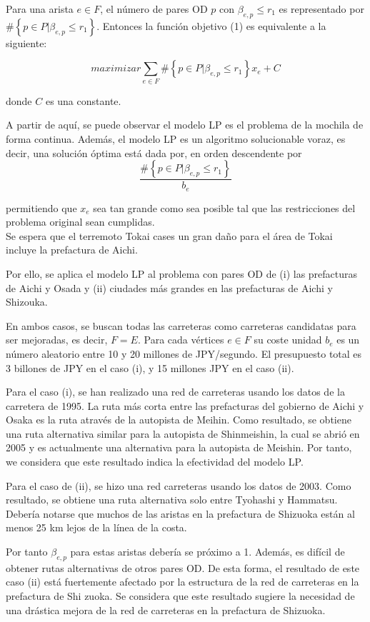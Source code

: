 \documentclass[10pt]{report}
\begin{document}
Para una arista $e \in F$, el número de pares OD $p$ con $\beta_{e,p} \leq r_{1}$ es representado por $\#\left\{ p \in P | \beta_{e,p} \leq r_{1} \right \}$. 
Entonces la función objetivo  (1) es equivalente a la siguiente:

$$
maximizar \sum_{e \in F} \#\left\{ p \in P | \beta_{e,p} \leq r_{1} \right\} x_{e} + C
$$

donde $C$ es una constante.

A partir de aquí, se puede observar el modelo LP es el problema de la mochila de forma continua. Además, el modelo LP es un algoritmo solucionable voraz, es decir, una solución óptima está dada por, en orden descendente  por
$$
\frac{\#\left\{ p \in P | \beta_{e,p} \leq r_{1} \right\}}{b_{e}}
$$

permitiendo que $x_{e}$ sea tan grande como sea posible tal que las restricciones del problema original sean cumplidas.\\

Se espera que el terremoto Tokai cases un gran daño para el área de Tokai incluye la prefactura de Aichi.

Por ello, se aplica el modelo LP al problema con pares OD de (i) las prefacturas de Aichi y Osada y (ii)  ciudades más grandes en las prefacturas de Aichi y Shizouka.

En ambos casos, se buscan todas las carreteras como carreteras candidatas para ser mejoradas, es decir, $F=E$.
Para cada vértices $e \in F$ su coste unidad $b_{e}$ es un número aleatorio entre 10 y 20 millones de JPY/segundo. El presupuesto total es 3 billones de JPY en el caso (i), y 15 millones  JPY en el caso (ii).

Para el caso (i), se han realizado una red de carreteras usando los datos de la carretera de 1995. La ruta más corta entre las prefacturas  del gobierno de Aichi y Osaka es la ruta através de la autopista de Meihin. Como resultado, se obtiene una ruta alternativa similar para la autopista de Shinmeishin, la cual se abrió en 2005 y es actualmente una alternativa para la autopista de Meishin.
Por tanto, we considera que este resultado indica la efectividad del modelo LP.

Para el caso de (ii), se hizo una red carreteras usando los datos de 2003.  Como resultado, se obtiene una ruta alternativa solo entre Tyohashi y Hammatsu.
Debería notarse que muchos de las aristas en la prefactura de Shizuoka están al menos 25 km lejos de la línea de la costa.

Por tanto $\beta_{e,p}$ para estas aristas debería se próximo a 1.
Además, es difícil de obtener rutas alternativas de otros pares OD. De esta forma, el resultado de este caso (ii)  está fuertemente afectado por la estructura de la red de carreteras en la prefactura de Shi zuoka. Se considera que este resultado sugiere la necesidad de una drástica mejora de la red de carreteras en la prefactura de Shizuoka.\\
\end{document}
